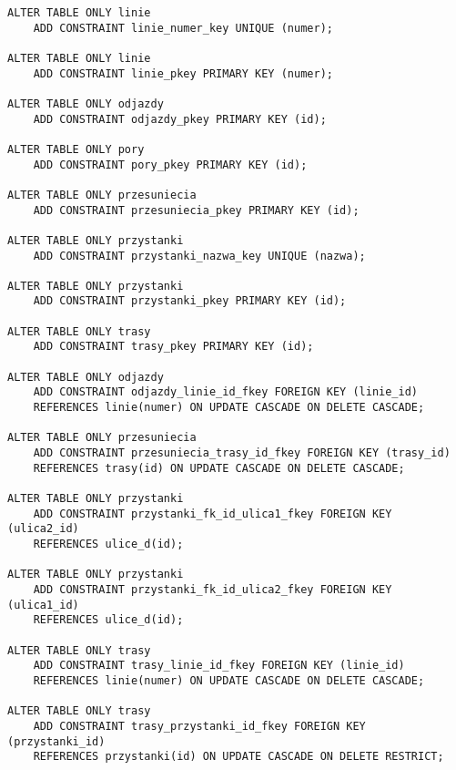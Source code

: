 \begin{verbatim}
ALTER TABLE ONLY linie
    ADD CONSTRAINT linie_numer_key UNIQUE (numer);

ALTER TABLE ONLY linie
    ADD CONSTRAINT linie_pkey PRIMARY KEY (numer);

ALTER TABLE ONLY odjazdy
    ADD CONSTRAINT odjazdy_pkey PRIMARY KEY (id);

ALTER TABLE ONLY pory
    ADD CONSTRAINT pory_pkey PRIMARY KEY (id);

ALTER TABLE ONLY przesuniecia
    ADD CONSTRAINT przesuniecia_pkey PRIMARY KEY (id);

ALTER TABLE ONLY przystanki
    ADD CONSTRAINT przystanki_nazwa_key UNIQUE (nazwa);

ALTER TABLE ONLY przystanki
    ADD CONSTRAINT przystanki_pkey PRIMARY KEY (id);

ALTER TABLE ONLY trasy
    ADD CONSTRAINT trasy_pkey PRIMARY KEY (id);

ALTER TABLE ONLY odjazdy
    ADD CONSTRAINT odjazdy_linie_id_fkey FOREIGN KEY (linie_id) 
    REFERENCES linie(numer) ON UPDATE CASCADE ON DELETE CASCADE;

ALTER TABLE ONLY przesuniecia
    ADD CONSTRAINT przesuniecia_trasy_id_fkey FOREIGN KEY (trasy_id) 
    REFERENCES trasy(id) ON UPDATE CASCADE ON DELETE CASCADE;

ALTER TABLE ONLY przystanki
    ADD CONSTRAINT przystanki_fk_id_ulica1_fkey FOREIGN KEY (ulica2_id) 
    REFERENCES ulice_d(id);

ALTER TABLE ONLY przystanki
    ADD CONSTRAINT przystanki_fk_id_ulica2_fkey FOREIGN KEY (ulica1_id) 
    REFERENCES ulice_d(id);

ALTER TABLE ONLY trasy
    ADD CONSTRAINT trasy_linie_id_fkey FOREIGN KEY (linie_id) 
    REFERENCES linie(numer) ON UPDATE CASCADE ON DELETE CASCADE;

ALTER TABLE ONLY trasy
    ADD CONSTRAINT trasy_przystanki_id_fkey FOREIGN KEY (przystanki_id) 
    REFERENCES przystanki(id) ON UPDATE CASCADE ON DELETE RESTRICT;
\end{verbatim}



